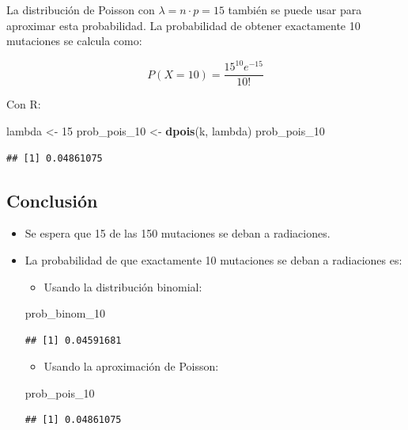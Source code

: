 \documentclass[
]{article}
\newenvironment{Shaded}{\begin{snugshade}}{\end{snugshade}}
\newcommand{\DecValTok}[1]{\textcolor[rgb]{0.00,0.00,0.81}{#1}}
\newcommand{\FunctionTok}[1]{\textcolor[rgb]{0.13,0.29,0.53}{\textbf{#1}}}
\newcommand{\NormalTok}[1]{#1}
\newcommand{\OtherTok}[1]{\textcolor[rgb]{0.56,0.35,0.01}{#1}}
\providecommand{\tightlist}{%
  \setlength{\itemsep}{0pt}\setlength{\parskip}{0pt}}
\begin{document}
La distribución de Poisson con \(\lambda = n \cdot p = 15\) también se puede usar para aproximar esta probabilidad. La probabilidad de obtener exactamente 10 mutaciones se calcula como:

\[ P(X = 10) = \frac{15^{10} e^{-15}}{10!} \]

Con R:

\begin{Shaded}
\begin{Highlighting}[]
\NormalTok{lambda }\OtherTok{\textless{}{-}} \DecValTok{15}
\NormalTok{prob\_pois\_10 }\OtherTok{\textless{}{-}} \FunctionTok{dpois}\NormalTok{(k, lambda)}
\NormalTok{prob\_pois\_10}
\end{Highlighting}
\end{Shaded}

\begin{verbatim}
## [1] 0.04861075
\end{verbatim}

\subsection{Conclusión}\label{conclusiuxf3n-1}

\begin{itemize}
\item
  Se espera que 15 de las 150 mutaciones se deban a radiaciones.
\item
  La probabilidad de que exactamente 10 mutaciones se deban a radiaciones es:

  \begin{itemize}
  \tightlist
  \item
    Usando la distribución binomial:
  \end{itemize}

\begin{Shaded}
\begin{Highlighting}[]
\NormalTok{prob\_binom\_10}
\end{Highlighting}
\end{Shaded}

\begin{verbatim}
## [1] 0.04591681
\end{verbatim}

  \begin{itemize}
  \tightlist
  \item
    Usando la aproximación de Poisson:
  \end{itemize}

\begin{Shaded}
\begin{Highlighting}[]
\NormalTok{prob\_pois\_10}
\end{Highlighting}
\end{Shaded}

\begin{verbatim}
## [1] 0.04861075
\end{verbatim}
\end{itemize}
\end{document}
